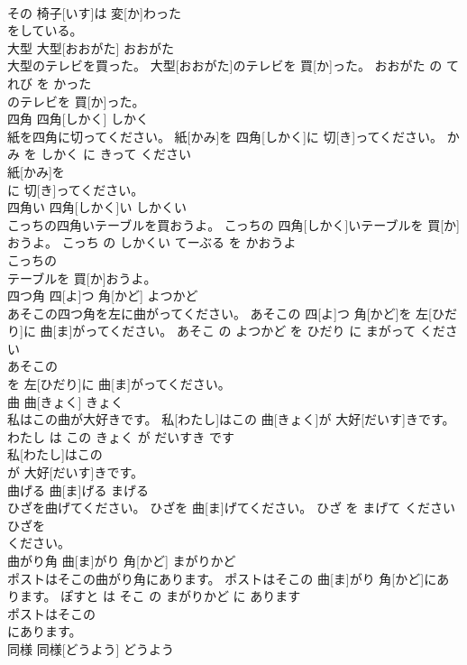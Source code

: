\documentclass[8pt]{extreport}
\begin{document}
\begin{CJK}{UTF8}{min}
\\	その 椅子[いす]は 変[か]わった
\\	をしている。			
\\	大型	大型[おおがた]	おおがた	
\\	大型のテレビを買った。	大型[おおがた]のテレビを 買[か]った。	おおがた の てれび を かった	
\\	のテレビを 買[か]った。			
\\	四角	四角[しかく]	しかく	
\\	紙を四角に切ってください。	紙[かみ]を 四角[しかく]に 切[き]ってください。	かみ を しかく に きって ください	
\\	紙[かみ]を
\\	に 切[き]ってください。			
\\	四角い	四角[しかく]い	しかくい	
\\	こっちの四角いテーブルを買おうよ。	こっちの 四角[しかく]いテーブルを 買[か]おうよ。	こっち の しかくい てーぶる を かおうよ	
\\	こっちの
\\	テーブルを 買[か]おうよ。			
\\	四つ角	四[よ]つ 角[かど]	よつかど	
\\	あそこの四つ角を左に曲がってください。	あそこの 四[よ]つ 角[かど]を 左[ひだり]に 曲[ま]がってください。	あそこ の よつかど を ひだり に まがって ください	
\\	あそこの
\\	を 左[ひだり]に 曲[ま]がってください。			
\\	曲	曲[きょく]	きょく	
\\	私はこの曲が大好きです。	私[わたし]はこの 曲[きょく]が 大好[だいす]きです。	わたし は この きょく が だいすき です	
\\	私[わたし]はこの
\\	が 大好[だいす]きです。			
\\	曲げる	曲[ま]げる	まげる	
\\	ひざを曲げてください。	ひざを 曲[ま]げてください。	ひざ を まげて ください	
\\	ひざを
\\	ください。			
\\	曲がり角	曲[ま]がり 角[かど]	まがりかど	
\\	ポストはそこの曲がり角にあります。	ポストはそこの 曲[ま]がり 角[かど]にあります。	ぽすと は そこ の まがりかど に あります	
\\	ポストはそこの
\\	にあります。			
\\	同様	同様[どうよう]	どうよう	

\end{CJK}
\end{document}

